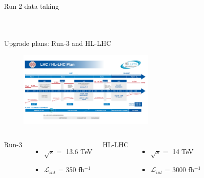 \begin{frame}{Run 2 data taking}
\begin{columns}
\begin{figure}
    \centering
\end{figure}

\end{columns}  
\end{frame}

\begin{frame}{Upgrade plans: Run-3 and HL-LHC}
    \begin{figure}
        \centering
        \includegraphics[width=0.6\textwidth]{Part2/Img/HL-LHC-plan-2021-1.pdf}
    \end{figure}
\begin{columns}
\begin{center}
    Run-3
\end{center}
\begin{itemize}
    \item $\sqrt{s}=$ 13.6 TeV
    \item $\mathcal{L}_{int}$ = 350 fb$^{-1}$
\end{itemize}

\begin{center}
    HL-LHC
\end{center}
\begin{itemize}
    \item $\sqrt{s}=$ 14 TeV
    \item $\mathcal{L}_{int}$ = 3000 fb$^{-1}$
\end{itemize}

\end{columns}
\end{frame}

